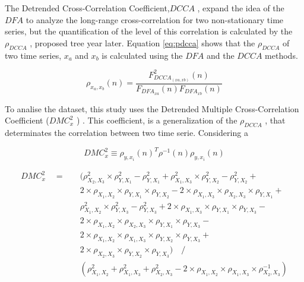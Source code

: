 \documentclass[10pt,letterpaper]{article}
\newcommand{\dmc}{\(DMC_x^2\) }
\newcommand{\pdcca}{\({\rho}_{DCCA}\) }
\begin{document}
The Detrended Cross-Correlation Coefficient,\(DCCA\) \cite{Podobnik2008}, expand the idea of the \(DFA\) to analyze the long-range cross-correlation for two non-stationary time series, but the quantification of the level of this correlation is calculated by the \pdcca \cite{Zebende2011}, proposed tree year later. Equation \ref{eq:pdcca} shows that the \pdcca of two time series, \(x_{a}\) and \(x_{b}\) is calculated using the \(DFA\) and the \(DCCA\) methods. 

\begin{equation}\label{eq:pdcca}
  {\rho}_{x_{a},x_{b}}(n) = \frac{F_{DCCA_{(xa,xb)}}^{2}(n)}{F_{DFA_{xa}}(n) F_{DFA_{xb}}(n)}
  \end{equation}

To analise the dataset, this study uses the Detrended Multiple Cross-Correlation Coefficient (\dmc) \cite{Zebende2018}. This coefficient, is a generalization of the \pdcca, that determinates the correlation between two time serie. Considering a  

\begin{equation}\label{eq:dmc}
  {DMC}_{x}^{2}  \equiv \rho_{y,x_{i}}(n)^{T} \rho^{-1}(n) \rho_{y,x_{i}}(n)
\end{equation}

\begin{equation}\label{eq:dmc_4x_y} 
  \begin{split}
DMC_{x}^{2} \quad = \quad & ( \rho^{2}_{X_{2},X_{3}} \times \rho^{2}_{Y,X_{1}}- \rho^{2}_{Y,X_{1}} + \rho^{2}_{X_{1},X_{3}}\times \rho^{2}_{Y,X_{2}}-\rho^{2}_{Y,X_{2}}+ \\
& 2 \times \rho_{X_{1},X_{2}} \times \rho_{Y,X_{1}} \times \rho_{Y,X_{2}}   - 2 \times \rho_{X_{1},X_{3}} \times \rho_{X_{2},X_{3}} \times \rho_{Y,X_{1}} + \\
& \rho^{2}_{X_{1},X_{2}} \times \rho^{2}_{Y,X_{3}}-\rho^{2}_{Y,X_{3}} + 2 \times \rho_{X_{1},X_{3}} \times \rho_{Y,X_{1}} \times \rho_{Y,X_{3}} - \\ 
& 2 \times \rho_{X_{1},X_{2}} \times \rho_{X_{2},X_{3}} \times \rho_{Y,X_{1}} \times \rho_{Y,X_{3}} - \\
& 2 \times \rho_{X_{1},X_{2}} \times \rho_{X_{1},X_{3}} \times \rho_{Y,X_{2}} \times \rho_{Y,X_{3}} + \\
& 2 \times \rho_{X_{2},X_{3}} \times \rho_{Y,X_{2}} \times \rho_{Y,X_{3}} ) \quad / \\
& ( \rho^{2}_{X_{1},X_{2}} + \rho^{2}_{X_{1},X_{3}} + \rho^{2}_{X_{2},X_{3}} - 2 \times \rho_{X_{1},X_{2}} \times \rho_{X_{1},X_{3}} \times \rho_{X_{2},X_{3}}^{-1}) \\
 \end{split}
\end{equation}
\end{document}
